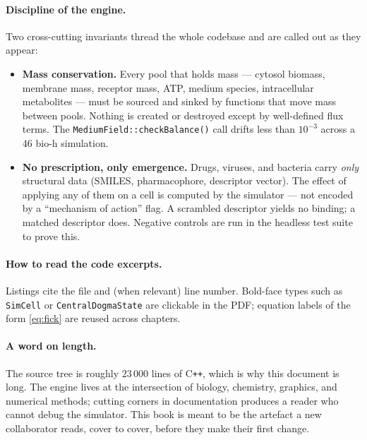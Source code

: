 \documentclass[11pt,letterpaper,twoside,openany]{book}
\newcommand{\code}[1]{\texttt{#1}}
\begin{document}
\paragraph{Discipline of the engine.} Two cross-cutting invariants
thread the whole codebase and are called out as they appear:
\begin{itemize}
  \item \textbf{Mass conservation.} Every pool that holds mass ---
        cytosol biomass, membrane mass, receptor mass, ATP, medium
        species, intracellular metabolites --- must be sourced and
        sinked by functions that move mass between pools. Nothing is
        created or destroyed except by well-defined flux terms. The
        \code{MediumField::checkBalance()} call drifts less than
        $10^{-3}$ across a 46 bio-h simulation.
  \item \textbf{No prescription, only emergence.} Drugs, viruses, and
        bacteria carry \emph{only} structural data (SMILES,
        pharmacophore, descriptor vector). The effect of applying any
        of them on a cell is computed by the simulator
        --- not encoded by a ``mechanism of action''
        flag. A scrambled descriptor yields no binding; a matched
        descriptor does. Negative controls are run in the headless
        test suite to prove this.
\end{itemize}

\paragraph{How to read the code excerpts.} Listings cite the file
and (when relevant) line number. Bold-face types such as
\code{SimCell} or \code{CentralDogmaState} are clickable in the PDF;
equation labels of the form \eqref{eq:fick} are reused across
chapters.

\paragraph{A word on length.} The source tree is roughly
$23\,000$ lines of C\texttt{++}, which is why this document is long.
The engine lives at the intersection of biology, chemistry, graphics,
and numerical methods; cutting corners in documentation produces a
reader who cannot debug the simulator. This book is meant to be the
artefact a new collaborator reads, cover to cover, before they make
their first change.

\tableofcontents
\listoftables
\listoffigures
\mainmatter
\end{document}
